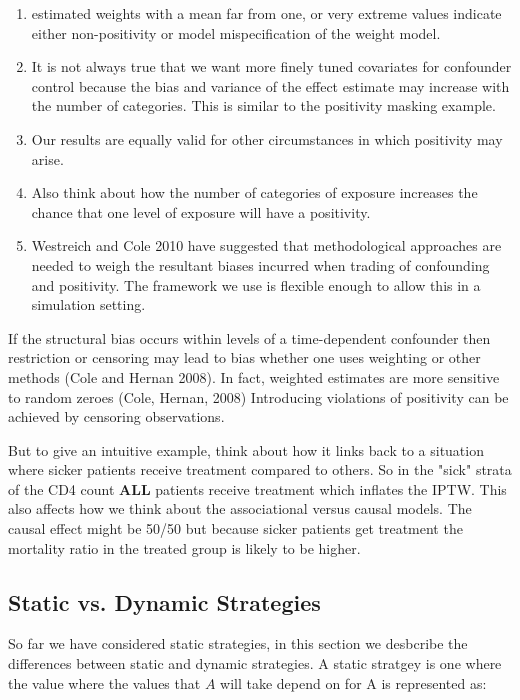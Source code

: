 \documentclass[11pt]{article}
\providecommand{\tightlist}{%
      \setlength{\itemsep}{0pt}\setlength{\parskip}{0pt}}
\begin{document}
\begin{enumerate}
\def\labelenumi{\arabic{enumi}.}
\setcounter{enumi}{5}
\tightlist
\item
  estimated weights with a mean far from one, or very extreme values
  indicate either non-positivity or model mispecification of the weight
  model.
\item
  It is not always true that we want more finely tuned covariates for
  confounder control because the bias and variance of the effect
  estimate may increase with the number of categories. This is similar
  to the positivity masking example.
\item
  Our results are equally valid for other circumstances in which
  positivity may arise.
\item
  Also think about how the number of categories of exposure increases
  the chance that one level of exposure will have a positivity.
\item
  Westreich and Cole 2010 have suggested that methodological approaches
  are needed to weigh the resultant biases incurred when trading of
  confounding and positivity. The framework we use is flexible enough to
  allow this in a simulation setting.
\end{enumerate}

If the structural bias occurs within levels of a time-dependent
confounder then restriction or censoring may lead to bias whether one
uses weighting or other methods (Cole and Hernan 2008). In fact,
weighted estimates are more sensitive to random zeroes (Cole, Hernan,
2008) Introducing violations of positivity can be achieved by censoring
observations.

But to give an intuitive example, think about how it links back to a
situation where sicker patients receive treatment compared to others. So
in the "sick" strata of the CD4 count \textbf{ALL} patients receive
treatment which inflates the IPTW. This also affects how we think about
the associational versus causal models. The causal effect might be 50/50
but because sicker patients get treatment the mortality ratio in the
treated group is likely to be higher.

    \subsection{Static vs. Dynamic
Strategies}\label{static-vs.-dynamic-strategies}

So far we have considered static strategies, in this section we
desbcribe the differences between static and dynamic strategies. A
static stratgey is one where the value where the values that \(A\) will
take depend on for A is represented as:
\end{document}
